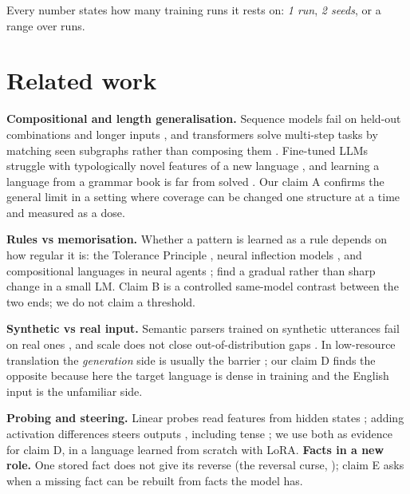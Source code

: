 \documentclass{article} %
\begin{document}
Every number states how many training runs it rests on: \emph{1 run}, \emph{2 seeds}, or a range over runs.

\section{Related work}\label{sec:related}

\textbf{Compositional and length generalisation.} Sequence models fail on held-out combinations and longer inputs
\citep{lake2018scan,kim2020cogs}, and transformers solve multi-step tasks by matching seen subgraphs rather than
composing them \citep{dziri2023faith}. Fine-tuned LLMs struggle with typologically novel features of a new
language \citep{marmonier2025explicit}, and learning a language from a grammar book is far from solved
\citep{tanzer2024mtob}. Our claim A confirms the general limit in a setting where coverage can be changed one
structure at a time and measured as a dose.

\textbf{Rules vs memorisation.} Whether a pattern is learned as a rule depends on how regular it is: the Tolerance
Principle \citep{yang2016price,schuler2016tolerance}, neural inflection models
\citep{kirov2018recurrent,mccurdy2020inflecting}, and compositional languages in neural agents
\citep{galke2024compositional}; \citet{friedman2026tolerance} find a gradual rather than sharp change in a small LM.
Claim B is a controlled same-model contrast between the two ends; we do not claim a threshold.

\textbf{Synthetic vs real input.} Semantic parsers trained on synthetic utterances fail on real ones
\citep{wang2015overnight,herzig2019detect,marzoev2020unnatural}, and scale does not close out-of-distribution gaps
\citep{qiu2022scale}. In low-resource translation the \emph{generation} side is usually the barrier
\citep{bafna2025barrier,vamvas2026romansh}; our claim D finds the opposite because here the target language is
dense in training and the English input is the unfamiliar side.

\textbf{Probing and steering.} Linear probes read features from hidden states \citep{alain2016probes}; adding
activation differences steers outputs \citep{turner2023actadd,panickssery2024caa}, including tense
\citep{klerings2025tense}; we use both as evidence for claim D, in a language learned from scratch with LoRA.
\textbf{Facts in a new role.} One stored fact does not give its reverse (the reversal curse,
\citealp{berglund2024reversal}); claim E asks when a missing fact can be rebuilt from facts the model has.
\end{document}
